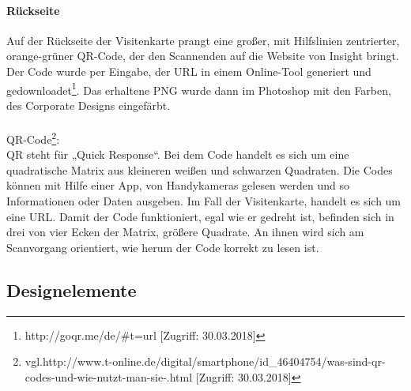 \paragraph{Rückseite}
Auf der Rückseite der Visitenkarte prangt eine großer, mit Hilfslinien zentrierter, orange-grüner QR-Code, der den Scannenden auf die Website von Insight bringt. Der Code wurde per Eingabe, der URL in einem Online-Tool generiert und gedownloadet\footnote{\label{} http://goqr.me/de/\#t=url [Zugriff: 30.03.2018]}. Das erhaltene PNG wurde dann im Photoshop mit den Farben, des Corporate Designs eingefärbt.
\leavevmode \\
\leavevmode \\
QR-Code\footnote{\label{} vgl.http://www.t-online.de/digital/smartphone/id\_46404754/was-sind-qr-codes-und-wie-nutzt-man-sie-.html [Zugriff: 30.03.2018]}:  
\leavevmode \\
QR steht für „Quick Response“. Bei dem Code handelt es sich um eine quadratische Matrix aus kleineren weißen und schwarzen Quadraten. Die Codes können mit Hilfe einer App, von Handykameras gelesen werden und so Informationen oder Daten ausgeben. Im Fall der Visitenkarte, handelt es sich um eine URL. Damit der Code funktioniert, egal wie er gedreht ist, befinden sich in drei von vier Ecken der Matrix, größere Quadrate. An ihnen wird sich am Scanvorgang orientiert, wie herum der Code korrekt zu lesen ist.

\subsection{Designelemente}
